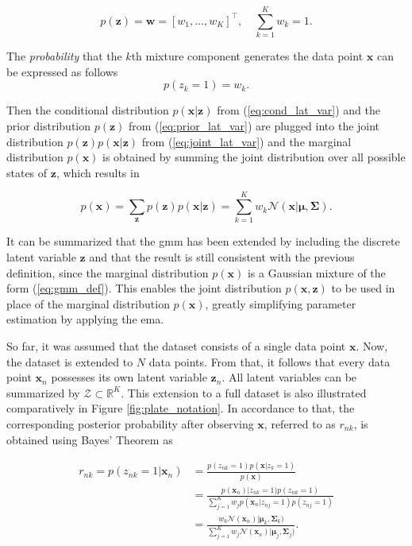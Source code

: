\documentclass[../../../main.tex]{subfiles}
\begin{document}
\begin{equation}\label{eq:prior_lat_var}
    p(\bm{z})=\bm{w}=[w_{1}, \dots, w_{K}]^\top, \quad \sum\limits_{k=1}^Kw_{k}=1.
\end{equation}

The \textit{probability} that the $k$th mixture component generates the data point $\bm{x}$ can be expressed as follows
\begin{equation}
    p(z_k=1)=w_k.
\end{equation}


Then the conditional distribution $p(\bm{x}|\bm{z})$ from (\ref{eq:cond_lat_var}) and the prior distribution $p(\bm{z})$ from (\ref{eq:prior_lat_var}) are plugged into the joint distribution $p(\bm{z})p(\bm{x}|\bm{z})$ from (\ref{eq:joint_lat_var}) and the marginal distribution $p(\bm{x})$ is obtained by summing the joint distribution over all possible states of $\bm{z}$, which results in 

\begin{equation}\label{eq:joint_marg_lat_var}
    p(\bm{x}) = \sum\limits_{\bm{z}}p(\bm{z})p(\bm{x}|\bm{z}) = \sum\limits_{k=1}^Kw_k\mathcal{N}(\bm{x} | \bm{\mu}, \bm{\Sigma}).
\end{equation}

It can be summarized that the \gls{gmm} has been extended by including the discrete latent variable  $\bm{z}$ and that the result is still consistent with the previous definition, since the marginal distribution $p(\bm{x})$ is a Gaussian mixture of the form (\ref{eq:gmm_def}). This enables the joint distribution $p(\bm{x}, \bm{z})$ to be used in place of the marginal distribution $p(\bm{x})$, greatly simplifying parameter estimation by applying the \gls{ema}.

So far, it was assumed that the dataset consists of a single data point $\bm{x}$. Now, the dataset is extended to $N$ data points. From that, it follows that every data point $\bm{x}_n$ possesses its own latent variable $\bm{z}_n$. All latent variables can be summarized by $\mathcal{Z} \subset \mathbb{R}^K$. This extension to a full dataset is also illustrated comparatively in Figure \ref{fig:plate_notation}. In accordance to that, the corresponding posterior probability after observing $\bm{x}$, referred to as $r_{nk}$, is obtained using Bayes' Theorem as

\begin{equation}\label{eq:responsibilities}
    \begin{aligned}
        r_{nk}=p(z_{nk}=1|\bm{x}_n) &= \frac{p(z_{nk}=1)p(\bm{x} | z_k=1)}{p(\bm{x})}\\[5pt]
        &= \frac{p(\bm{x}_n) | z_{nk}=1)p(z_{nk}=1)}{\sum_{j=1}^Kw_j p(\bm{x}_n | z_{nj}=1)p(z_{nj}=1)} \\[5pt]
        &= \frac{w_k\mathcal{N}(\bm{x}_n) | \bm{\mu}_k, \bm{\Sigma}_k)}{\sum_{j=1}^Kw_j\mathcal{N}(\bm{x}_n) | \bm{\mu}_j, \bm{\Sigma}_j)}.
    \end{aligned}
\end{equation}
\end{document}
